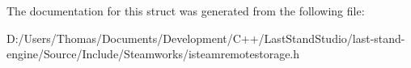 The documentation for this struct was generated from the following file\+:\begin{DoxyCompactItemize}
\item 
D\+:/\+Users/\+Thomas/\+Documents/\+Development/\+C++/\+Last\+Stand\+Studio/last-\/stand-\/engine/\+Source/\+Include/\+Steamworks/isteamremotestorage.\+h\end{DoxyCompactItemize}
